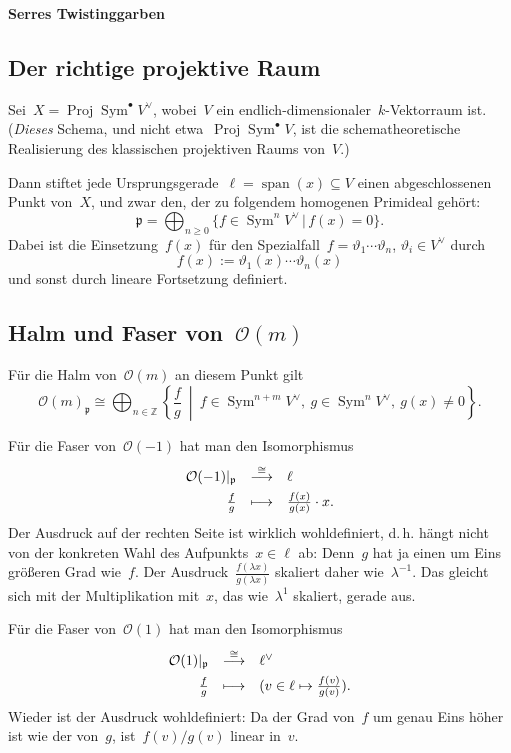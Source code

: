 \documentclass[a4paper,ngerman]{scrartcl}
\renewcommand{\O}{\mathcal{O}}
\newcommand{\ZZ}{\mathbb{Z}}
\DeclareMathOperator{\Span}{span}
\DeclareMathOperator{\Proj}{Proj}
\DeclareMathOperator{\Sym}{Sym}
\begin{document}
\begin{center}\Large\textbf{\textsf{Serres Twistinggarben}}\end{center}

\subsection*{Der richtige projektive Raum}

Sei~$X = \Proj \Sym^\bullet V^\vee$, wobei~$V$ ein endlich-dimensionaler~$k$-Vektorraum
ist. (\emph{Dieses} Schema, und nicht etwa~$\Proj \Sym^\bullet V$, ist die
schematheoretische Realisierung des klassischen projektiven Raums von~$V$.)

Dann stiftet jede Ursprungsgerade~$\ell = \Span(x) \subseteq V$ einen
abgeschlossenen Punkt von~$X$, und zwar den, der zu folgendem homogenen Primideal gehört:
\[ \mathfrak{p} = \bigoplus_{n \geq 0} \{ f \in \Sym^n V^\vee \,|\, f(x) = 0
\}. \]
Dabei ist die Einsetzung~$f(x)$ für den Spezialfall~$f = \vartheta_1 \cdots
\vartheta_n$, $\vartheta_i \in V^\vee$ durch
\[ f(x) := \vartheta_1(x) \cdots \vartheta_n(x) \]
und sonst durch lineare Fortsetzung definiert.

\subsection*{Halm und Faser von~$\O(m)$}

Für die Halm von~$\O(m)$ an diesem Punkt gilt
\[ \O(m)_\mathfrak{p} \cong
  \bigoplus_{n \in \ZZ}
  \left\{ \frac{f}{g} \ \middle|\  f \in \Sym^{n+m} V^\vee,\ g \in \Sym^n V^\vee,\ 
    g(x) \neq 0 \right\}. \]

Für die Faser von~$\O(-1)$ hat man den Isomorphismus
\[ \renewcommand{\arraystretch}{1.5}\begin{array}{@{}rcl@{}}
  \O(-1)|_\mathfrak{p} &\stackrel{\cong}{\longrightarrow}&
    \ell \\
  \frac{f}{g} &\longmapsto& \frac{f(x)}{g(x)} \cdot x.
\end{array} \]
Der Ausdruck auf der rechten Seite ist wirklich wohldefiniert, d.\,h. hängt
nicht von der konkreten Wahl des Aufpunkts~$x \in \ell$ ab: Denn~$g$ hat ja
einen um Eins größeren Grad wie~$f$. Der Ausdruck~$\frac{f(\lambda
x)}{g(\lambda x)}$ skaliert daher wie~$\lambda^{-1}$. Das gleicht sich mit der
Multiplikation mit~$x$, das wie~$\lambda^1$ skaliert, gerade aus.

Für die Faser von~$\O(1)$ hat man den Isomorphismus
\[ \renewcommand{\arraystretch}{1.5}\begin{array}{@{}rcl@{}}
  \O(1)|_\mathfrak{p} &\stackrel{\cong}{\longrightarrow}&
    \ell^\vee \\
  \frac{f}{g} &\longmapsto& (v \in \ell \mapsto \frac{f(v)}{g(v)}).
\end{array} \]
Wieder ist der Ausdruck wohldefiniert: Da der Grad von~$f$ um genau Eins höher
ist wie der von~$g$, ist~$f(v) / g(v)$ linear in~$v$.
\end{document}
